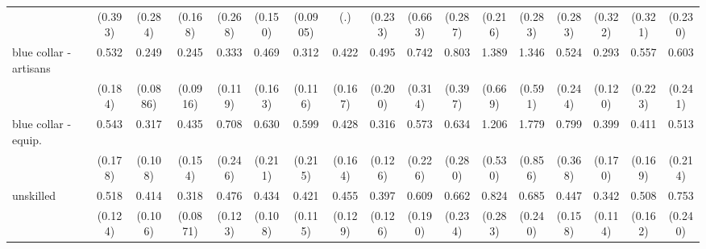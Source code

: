 {\begin{tabular}{l*{16}{c}}
                    &     (0.393)         &     (0.284)         &     (0.168)         &     (0.268)         &     (0.150)         &    (0.0905)         &         (.)         &     (0.233)         &     (0.663)         &     (0.287)         &     (0.216)         &     (0.283)         &     (0.283)         &     (0.322)         &     (0.321)         &     (0.230)         \\
[1em]
blue collar - artisans&       0.532         &       0.249\sym{***}&       0.245\sym{***}&       0.333\sym{**} &       0.469\sym{*}  &       0.312\sym{**} &       0.422\sym{*}  &       0.495         &       0.742         &       0.803         &       1.389         &       1.346         &       0.524         &       0.293\sym{**} &       0.557         &       0.603         \\
                    &     (0.184)         &    (0.0886)         &    (0.0916)         &     (0.119)         &     (0.163)         &     (0.116)         &     (0.167)         &     (0.200)         &     (0.314)         &     (0.397)         &     (0.669)         &     (0.591)         &     (0.244)         &     (0.120)         &     (0.223)         &     (0.241)         \\
[1em]
blue collar - equip.&       0.543         &       0.317\sym{***}&       0.435\sym{*}  &       0.708         &       0.630         &       0.599         &       0.428\sym{*}  &       0.316\sym{**} &       0.573         &       0.634         &       1.206         &       1.779         &       0.799         &       0.399\sym{*}  &       0.411\sym{*}  &       0.513         \\
                    &     (0.178)         &     (0.108)         &     (0.154)         &     (0.246)         &     (0.211)         &     (0.215)         &     (0.164)         &     (0.126)         &     (0.226)         &     (0.280)         &     (0.530)         &     (0.856)         &     (0.368)         &     (0.170)         &     (0.169)         &     (0.214)         \\
[1em]
unskilled           &       0.518\sym{**} &       0.414\sym{***}&       0.318\sym{***}&       0.476\sym{**} &       0.434\sym{***}&       0.421\sym{**} &       0.455\sym{**} &       0.397\sym{**} &       0.609         &       0.662         &       0.824         &       0.685         &       0.447\sym{*}  &       0.342\sym{**} &       0.508\sym{*}  &       0.753         \\
                    &     (0.124)         &     (0.106)         &    (0.0871)         &     (0.123)         &     (0.108)         &     (0.115)         &     (0.129)         &     (0.126)         &     (0.190)         &     (0.234)         &     (0.283)         &     (0.240)         &     (0.158)         &     (0.114)         &     (0.162)         &     (0.240)         \\

\end{tabular}}
